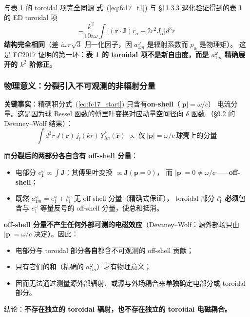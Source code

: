 \begin{stepbox}{与表 1 的 toroidal 项完全同源}
式~(\ref{eq:fc17_t1}) 与 \S11.3.3 退化验证得到的表 1 的 ED toroidal 项
$$
-\frac{k^2}{10i\omega}\int\bigl[(\mathbf{r}\cdot\mathbf{J})r_\alpha - 2r^2J_\alpha\bigr]d^3r
$$
\textbf{结构完全相同}（差 $i\omega\pi\sqrt{3}$ 归一化因子，因 $a^\omega_{1m}$ 是辐射系数而 $p_\alpha$ 是物理矩）。
这是 FC2017 证明的第一环：\textbf{表 1 的 toroidal 项不是新自由度，而是 $a^\omega_{1m}$ 精确展开的 $k^2$ 阶修正}。
\end{stepbox}

\subsubsection{物理意义：分裂引入不可观测的非辐射分量}

\textbf{关键事实}：精确积分式~(\ref{eq:fc17_start}) 只含有\textbf{on-shell}（$|\mathbf{p}|=\omega/c$）
电流分量。这是因为球 Bessel 函数的傅里叶变换对应动量空间径向 $\delta$ 函数
（\S9.2 的 Devaney--Wolf 结果）：
\begin{equation}
  \int d^3r\,J(\mathbf{r})\,j_l(kr)\,Y_{lm}^*(\hat{\mathbf{r}})
  \;\propto\; \text{仅}\ |\mathbf{p}|=\omega/c\ \text{球壳上的分量}
\end{equation}

而\textbf{分裂后的两部分各自含有 off-shell 分量}：
\begin{itemize}
  \item 电部分 $e^\omega_1\propto\int\mathbf{J}$：其傅里叶变换 $\propto \mathbf{J}(\mathbf{p}=0)$，
    而 $|\mathbf{p}|=0\neq\omega/c$——\textbf{off-shell}；
  \item 既然 $a^\omega_{1m}=e^\omega_1+t^\omega_1$ 无 off-shell 分量（精确式保证），
    toroidal 部分 $t^\omega_1$ \textbf{必须}包含与 $e^\omega_1$ 等量反号的 off-shell 分量，使总和抵消。
\end{itemize}

\begin{nontrivial}
\textbf{off-shell 分量不产生任何外部可测的电磁效应}（Devaney--Wolf：源外部场只由
$|\mathbf{p}|=\omega/c$ 决定）。因此：
\begin{itemize}
  \item 电部分与 toroidal 部分\textbf{各自}都含不可观测的 off-shell 贡献；
  \item 只有它们的\textbf{和}（精确的 $a^\omega_{1m}$）才有物理意义；
  \item 因而无法通过测量源外部辐射、或源与外场耦合来\textbf{单独}确定电部分或 toroidal 部分。
\end{itemize}
结论：\textbf{不存在独立的 toroidal 辐射，也不存在独立的 toroidal 电磁耦合。}
\end{nontrivial}

